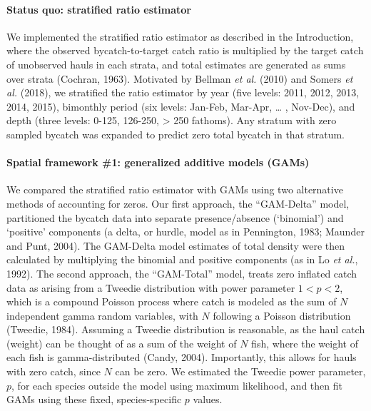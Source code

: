 \documentclass[]{article}
\let\oldparagraph\paragraph
\renewcommand{\paragraph}[1]{\oldparagraph{#1}\mbox{}}
\begin{document}
\paragraph{Status quo: stratified ratio
estimator}\label{status-quo-stratified-ratio-estimator}

We implemented the stratified ratio estimator as described in the
Introduction, where the observed bycatch-to-target catch ratio is
multiplied by the target catch of unobserved hauls in each strata, and
total estimates are generated as sums over strata (Cochran, 1963).
Motivated by Bellman \emph{et al.} (2010) and Somers \emph{et al.}
(2018), we stratified the ratio estimator by year (five levels: 2011,
2012, 2013, 2014, 2015), bimonthly period (six levels: Jan-Feb, Mar-Apr,
\ldots{} , Nov-Dec), and depth (three levels: 0-125, 126-250,
\textgreater{} 250 fathoms). Any stratum with zero sampled bycatch was
expanded to predict zero total bycatch in that stratum.

\paragraph{Spatial framework \#1: generalized additive models
(GAMs)}\label{spatial-framework-1-generalized-additive-models-gams}

We compared the stratified ratio estimator with GAMs using two
alternative methods of accounting for zeros. Our first approach, the
``GAM-Delta'' model, partitioned the bycatch data into separate
presence/absence (`binomial') and `positive' components (a delta, or
hurdle, model as in Pennington, 1983; Maunder and Punt, 2004). The
GAM-Delta model estimates of total density were then calculated by
multiplying the binomial and positive components (as in Lo \emph{et
al.}, 1992). The second approach, the ``GAM-Total'' model, treats zero
inflated catch data as arising from a Tweedie distribution with power
parameter \(1 < p < 2\), which is a compound Poisson process where catch
is modeled as the sum of \(N\) independent gamma random variables, with
\(N\) following a Poisson distribution (Tweedie, 1984). Assuming a
Tweedie distribution is reasonable, as the haul catch (weight) can be
thought of as a sum of the weight of \(N\) fish, where the weight of
each fish is gamma-distributed (Candy, 2004). Importantly, this allows
for hauls with zero catch, since \(N\) can be zero. We estimated the
Tweedie power parameter, \(p\), for each species outside the model using
maximum likelihood, and then fit GAMs using these fixed,
species-specific \(p\) values.
\end{document}
